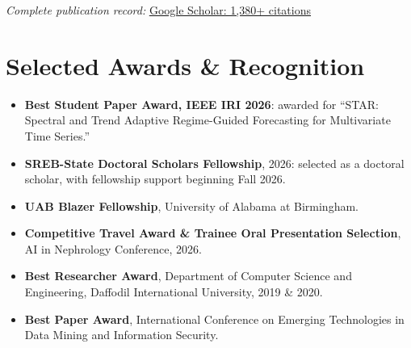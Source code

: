 \documentclass[letterpaper,10pt]{article}
\newcommand{\resumeItem}[1]{
    \item {\small #1}
}
\newcommand{\resumeItemListStart}{
    \begin{itemize}[leftmargin=0.20in,itemsep=1pt,
        topsep=3pt,parsep=0pt,partopsep=0pt]
}
\newcommand{\resumeItemListEnd}{
    \end{itemize}\vspace{-2pt}
}
\begin{document}
\noindent
\textit{Complete publication record:}
\href{https://scholar.google.com/citations?user=s2ocyEgAAAAJ}{
\underline{Google Scholar: 1,380+ citations}
}

\normalsize


\section{Selected Awards \& Recognition}

\resumeItemListStart

\resumeItem{
\textbf{Best Student Paper Award, IEEE IRI 2026}:
awarded for ``STAR: Spectral and Trend Adaptive Regime-Guided
Forecasting for Multivariate Time Series.''
}

\resumeItem{
\textbf{SREB-State Doctoral Scholars Fellowship}, 2026:
selected as a doctoral scholar, with fellowship support beginning
Fall 2026.
}

\resumeItem{
\textbf{UAB Blazer Fellowship},
University of Alabama at Birmingham.
}

\resumeItem{
\textbf{Competitive Travel Award \& Trainee Oral Presentation Selection},
AI in Nephrology Conference, 2026.
}

\resumeItem{
\textbf{Best Researcher Award},
Department of Computer Science and Engineering,
Daffodil International University, 2019 \& 2020.
}

\resumeItem{
\textbf{Best Paper Award},
International Conference on Emerging Technologies in Data Mining
and Information Security.
}

\resumeItemListEnd

\end{document}
